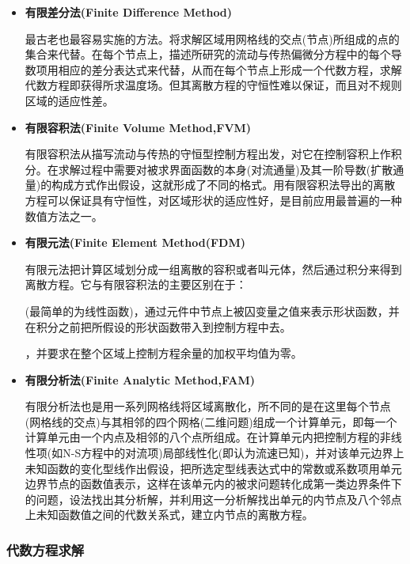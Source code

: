 \documentclass[UTF8]{article} %
\begin{document}
\begin{itemize}
    \item \textbf{有限差分法(Finite Difference Method)}
    
    最古老也最容易实施的方法。将求解区域用网格线的交点(节点)所组成的点的集合来代替。在每个节点上，描述所研究的流动与传热偏微分方程中的每个导数项用相应的差分表达式来代替，从而在每个节点上形成一个代数方程，求解代数方程即获得所求温度场。但其离散方程的守恒性难以保证，而且对不规则区域的适应性差。
    
    \item \textbf{有限容积法(Finite Volume Method,FVM)}
    
    有限容积法从描写流动与传热的守恒型控制方程出发，对它在控制容积上作积分。在求解过程中需要对被求界面函数的本身(对流通量)及其一阶导数(扩散通量)的构成方式作出假设，这就形成了不同的格式。用有限容积法导出的离散方程可以保证具有守恒性，对区域形状的适应性好，是目前应用最普遍的一种数值方法之一。
    
    \item \textbf{有限元法(Finite Element Method(FDM)}
    
    有限元法把计算区域划分成一组离散的容积或者叫元体，然后通过积分来得到离散方程。它与有限容积法的主要区别在于：
    
    (最简单的为线性函数)，通过元件中节点上被囚变量之值来表示形状函数，并在积分之前把所假设的形状函数带入到控制方程中去。
    
    ，并要求在整个区域上控制方程余量的加权平均值为零。
   
    \item \textbf{有限分析法(Finite Analytic Method,FAM)}
    
    有限分析法也是用一系列网格线将区域离散化，所不同的是在这里每个节点(网格线的交点)与其相邻的四个网格(二维问题)组成一个计算单元，即每一个计算单元由一个内点及相邻的八个点所组成。在计算单元内把控制方程的非线性项(如N-S方程中的对流项)局部线性化(即认为流速已知)，并对该单元边界上未知函数的变化型线作出假设，把所选定型线表达式中的常数或系数项用单元边界节点的函数值表示，这样在该单元内的被求问题转化成第一类边界条件下的问题，设法找出其分析解，并利用这一分析解找出单元的内节点及八个邻点上未知函数值之间的代数关系式，建立内节点的离散方程\cite{RN13}。

\end{itemize}

\subsubsection{代数方程求解}
\end{document}
